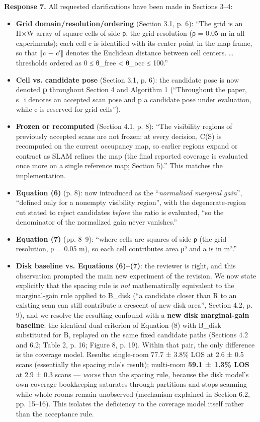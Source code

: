 \textbf{Response 7.} All requested clarifications have been made in Sections 3–4:
\begin{itemize}
\item \textbf{Grid domain/resolution/ordering} (Section 3.1, p. 6): “The grid is an H×W array of square cells of side ρ, the grid resolution (ρ = 0.05 m in all experiments); each cell c is identified with its center point in the map frame, so that ‖c − c′‖ denotes the Euclidean distance between cell centers. … thresholds ordered as 0 ≤ θ\_free < θ\_occ ≤ 100.”
\item \textbf{Cell vs. candidate pose} (Section 3.1, p. 6): the candidate pose is now denoted \textbf{p} throughout Section 4 and Algorithm 1 (“Throughout the paper, s\_i denotes an accepted scan pose and p a candidate pose under evaluation, while c is reserved for grid cells”).
\item \textbf{Frozen or recomputed} (Section 4.1, p. 8): “The visibility regions of previously accepted scans are not frozen: at every decision, C(S) is recomputed on the current occupancy map, so earlier regions expand or contract as SLAM refines the map (the final reported coverage is evaluated once more on a single reference map; Section 5).” This matches the implementation.
\item \textbf{Equation (6)} (p. 8): now introduced as the “\emph{normalized marginal gain}”, “defined only for a nonempty visibility region”, with the degenerate-region cut stated to reject candidates \emph{before} the ratio is evaluated, “so the denominator of the normalized gain never vanishes.”
\item \textbf{Equation (7)} (pp. 8–9): “where cells are squares of side ρ (the grid resolution, ρ = 0.05 m), so each cell contributes area ρ² and a is in m².”
\item \textbf{Disk baseline vs. Equations (6)–(7)}: the reviewer is right, and this observation prompted the main new experiment of the revision. We now state explicitly that the spacing rule is \emph{not} mathematically equivalent to the marginal-gain rule applied to B\_disk (“a candidate closer than R to an existing scan can still contribute a crescent of new disk area”, Section 4.2, p. 9), and we resolve the resulting confound with a \textbf{new disk marginal-gain baseline}: the identical dual criterion of Equation (8) with B\_disk substituted for B, replayed on the same fixed candidate paths (Sections 4.2 and 6.2; Table 2, p. 16; Figure 8, p. 19). Within that pair, the only difference is the coverage model. Results: single-room 77.7 ± 3.8\% LOS at 2.6 ± 0.5 scans (essentially the spacing rule’s result); multi-room \textbf{59.1 ± 1.3\% LOS} at 2.9 ± 0.3 scans — \emph{worse} than the spacing rule, because the disk model’s own coverage bookkeeping saturates through partitions and stops scanning while whole rooms remain unobserved (mechanism explained in Section 6.2, pp. 15–16). This isolates the deficiency to the coverage model itself rather than the acceptance rule.
\end{itemize}


